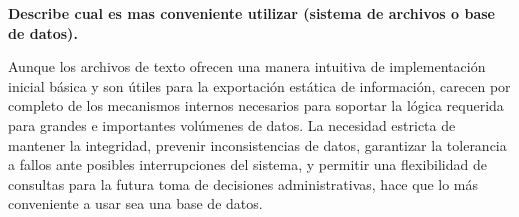 \item \textbf{Describe cual es mas conveniente utilizar (sistema de archivos o base de datos).}

Aunque los archivos de texto ofrecen una manera intuitiva de implementación inicial básica y son útiles para la exportación estática de información, carecen por completo de los mecanismos internos necesarios para soportar la lógica requerida para grandes e importantes volúmenes de datos. La necesidad estricta de mantener la integridad, prevenir inconsistencias de datos, garantizar la tolerancia a fallos ante posibles interrupciones del sistema, y permitir una flexibilidad de consultas para la futura toma de decisiones administrativas, hace que lo más conveniente a usar sea una base de datos.
